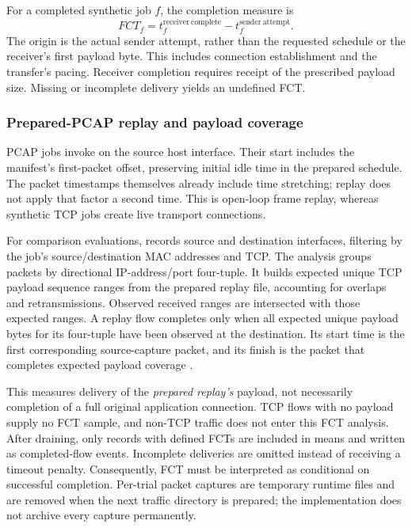 \documentclass[11pt,a4paper]{article}
\newcommand{\code}[1]{\texttt{\detokenize{#1}}}
\begin{document}
For a completed synthetic job $f$, the completion measure is
\begin{equation}
 FCT_f=t^{\mathrm{receiver\ complete}}_f
             -t^{\mathrm{sender\ attempt}}_f.
 \label{eq:managed-fct}
\end{equation}
The origin is the actual sender attempt, rather than the requested schedule or
the receiver's first payload byte. This includes connection establishment and
the transfer's pacing. Receiver completion requires receipt of the prescribed
payload size. Missing or incomplete delivery yields an undefined FCT.

\subsubsection{Prepared-PCAP replay and payload coverage}

PCAP jobs invoke \code{tcpreplay --multiplier=1} on the source host interface.
Their start includes the manifest's first-packet offset, preserving initial
idle time in the prepared schedule. The packet timestamps themselves already
include time stretching; replay does not apply that factor a second time.
This is open-loop frame replay, whereas synthetic TCP jobs create live
transport connections.

For comparison evaluations, \code{tcpdump} records source and destination
interfaces, filtering by the job's source/destination MAC addresses and TCP.
The analysis groups packets by directional IP-address/port four-tuple. It
builds expected unique TCP payload sequence ranges from the prepared replay
file, accounting for overlaps and retransmissions. Observed received ranges
are intersected with those expected ranges. A replay flow completes only
when all expected unique payload bytes for its four-tuple have been observed
at the destination. Its start time is the first corresponding source-capture
packet, and its finish is the packet that completes expected payload coverage
\cite{code-trials}.

This measures delivery of the \emph{prepared replay's} payload, not necessarily
completion of a full original application connection. TCP flows with no
payload supply no FCT sample, and non-TCP traffic does not enter this FCT
analysis. After draining, only records with defined FCTs are included in
means and written as completed-flow events. Incomplete deliveries are omitted
instead of receiving a timeout penalty. Consequently, FCT must be interpreted
as conditional on successful completion. Per-trial packet captures are
temporary runtime files and are removed when the next traffic directory is
prepared; the implementation does not archive every capture permanently.
\end{document}

